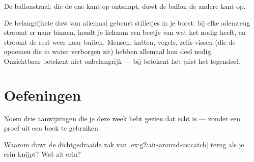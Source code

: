\begin{omfigure}

{\small De ballonstraal:  die de ene kant op ontsnapt, duwt de
ballon de andere kant op.}
\end{omfigure}

\begin{remark}\label{rem:g2:air-around-us:breathe}
De belangrijkste duw van allemaal gebeurt stilletjes in je borst: bij
elke ademteug stroomt er  naar binnen, houdt je lichaam een beetje
van wat het nodig heeft, en stroomt de rest weer naar buiten. Mensen,
katten, vogels, zelfs vissen (die de  opnemen die in water
verborgen zit) hebben allemaal hun deel nodig. Onzichtbaar betekent
niet onbelangrijk --- bij  betekent het juist het tegendeel.
\end{remark}

\section{Oefeningen}

\begin{exercise}[$\star$]\label{exo:g2:air-around-us:1}
Noem drie aanwijzingen die je deze week hebt gezien dat  echt is
--- zonder een proef uit een boek te gebruiken.
\end{exercise}

\begin{exercise}[$\star$]\label{exo:g2:air-around-us:2}
Waarom duwt de dichtgedraaide zak van \cref{ex:g2:air-around-us:catch}
terug als je erin knijpt? Wat zit erin?
\end{exercise}

